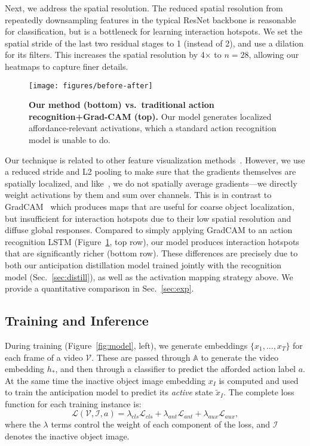 \documentclass[10pt,twocolumn,letterpaper]{article}
\newcommand{\reffig}[1]{Figure~\ref{#1}}
\begin{document}
Next, we address the spatial resolution. The reduced spatial resolution from repeatedly downsampling features in the typical ResNet backbone is reasonable for classification, but is a bottleneck for learning interaction hotspots. We set the spatial stride of the last two residual stages to 1 (instead of 2), and use a dilation for its filters. This increases the spatial resolution by 4$\times$ to $n=28$, allowing our heatmaps to capture finer details. 


\begin{figure}[t!]
\centering
\texttt{[image: figures/before-after]}\vspace*{-0.1in}
\caption{\textbf{Our method (bottom) vs.~traditional action recognition+Grad-CAM (top).} Our model generates localized affordance-relevant activations, which a standard action recognition model is unable to do. }
\label{fig:before-after}
\end{figure}

Our technique is related to other feature visualization methods~\cite{springenberg2015striving,zhou2016learning,selvaraju2017grad}. However, we use a reduced stride and L2 pooling to make sure that the gradients themselves are spatially localized, and like~\cite{springenberg2015striving}, we do not spatially average gradients---we directly weight activations by them and sum over channels. This is in contrast to GradCAM~\cite{zhou2016learning,selvaraju2017grad} which produces maps that are useful for coarse object localization, but insufficient for interaction hotspots due to their low spatial resolution and diffuse global responses.  Compared to simply applying GradCAM to an action recognition LSTM (\reffig{fig:before-after}, top row), our model produces interaction hotspots that are significantly richer (bottom row). These differences are precisely due to both our anticipation distillation model trained jointly with the recognition model (Sec.~\ref{sec:distill}), as well as the activation mapping strategy above. We provide a quantitative comparison in Sec.~\ref{sec:exp}.

\subsection{Training and Inference} \label{sec:inference}

During training (\reffig{fig:model}, left), we generate embeddings $\{x_1, ..., x_T\}$ for each frame of a video $\mathcal{V}$. These are passed through $\mathbb{A}$ to generate the video embedding $h_*$, and then through a classifier to predict the afforded action label $a$. At the same time the inactive object image embedding $x_I$ is computed and used to train the anticipation model to predict its \emph{active} state $\widetilde{x}_I$. 
The complete loss function for each training instance is:
\begin{equation} \label{eqn:total_loss}
    \mathcal{L}(\mathcal{V},\mathcal{I}, a) = 
    \lambda_{cls} \mathcal{L}_{cls}+
    \lambda_{ant} \mathcal{L}_{ant} +
    \lambda_{aux} \mathcal{L}_{aux},
\end{equation}
where the $\lambda$ terms control the weight of each component of the loss, and $\mathcal{I}$ denotes the inactive object image.
\end{document}

